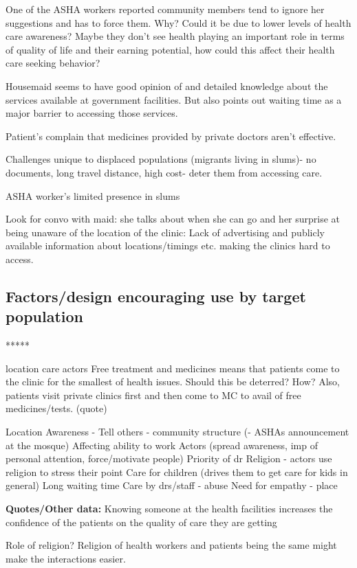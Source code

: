 One of the ASHA workers reported community members tend to ignore her suggestions and has to force them. Why? Could it be due to lower levels of health care awareness? Maybe they don't see health playing an important role in terms of quality of life and their earning potential, how could this affect their health care seeking behavior? 

Housemaid seems to have good opinion of and detailed knowledge about the services available at government facilities. But also points out waiting time as a major barrier to accessing those services.

Patient's complain that medicines provided by private doctors aren't effective. 

Challenges unique to displaced populations (migrants living in slums)- no documents, long travel distance, high cost- deter them from accessing care.

ASHA worker's limited presence in slums 

Look for convo with maid: she talks about when she can go and her surprise at being unaware of the location of the clinic: Lack of advertising and publicly available information about locations/timings etc.  making the clinics hard to access.

\subsection{Factors/design encouraging use by target population}

*****

location
care
actors
Free treatment and medicines means that patients come to the clinic for the smallest of health issues. Should this be deterred? How? Also, patients visit private clinics first and then come to MC to avail of free medicines/tests. (quote)

Location
Awareness - Tell others - community structure (- ASHAs announcement at the mosque)
Affecting ability to work
Actors (spread awareness, imp of personal attention, force/motivate people)
Priority of dr
Religion - actors use religion to stress their point
Care for children (drives them to get care for kids in general)
Long waiting time
Care by drs/staff - abuse 
Need for empathy - place

\textbf{Quotes/Other data:}
Knowing someone at the health facilities increases the confidence of the patients on the quality of care they are getting

Role of religion? Religion of health workers and patients being the same might make the interactions easier.

